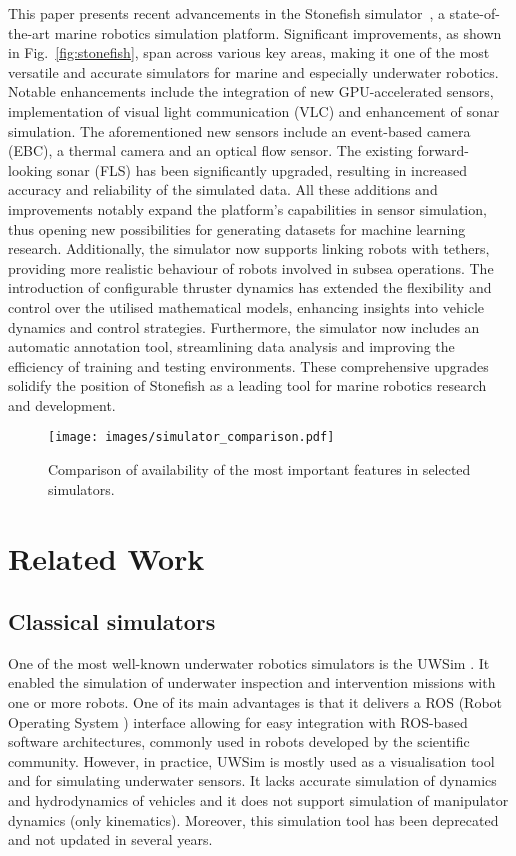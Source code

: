 This paper presents recent advancements in the Stonefish simulator~\cite{cieslak2019stonefish}, a state-of-the-art marine robotics simulation platform. Significant improvements, as shown in Fig.~\ref{fig:stonefish}, span across various key areas, making it one of the most versatile and accurate simulators for marine and especially underwater robotics. Notable enhancements include the integration of new GPU-accelerated sensors, implementation of visual light communication (VLC) and enhancement of sonar simulation. The aforementioned new sensors include an event-based camera (EBC), a thermal camera and an optical flow sensor. The existing forward-looking sonar (FLS) has been significantly upgraded, resulting in increased accuracy and reliability of the simulated data. 
All these additions and improvements notably expand the platform’s capabilities in sensor simulation, thus opening new possibilities for generating datasets for machine learning research. Additionally, the simulator now supports linking robots with tethers, providing more realistic behaviour of robots involved in subsea operations. The introduction of configurable thruster dynamics has extended the flexibility and control over the utilised mathematical models, enhancing insights into vehicle dynamics and control strategies. Furthermore, the simulator now includes an automatic annotation tool, streamlining data analysis and improving the efficiency of training and testing environments. These comprehensive upgrades solidify the position of Stonefish as a leading tool for marine robotics research and development.




\begin{figure*}[tp] 
\centering
    \texttt{[image: images/simulator\_comparison.pdf]}
    \caption{Comparison of availability of the most important features in selected simulators.}
    \label{fig:comparison}
\end{figure*}

\section{Related Work}




\subsection{Classical simulators}

One of the most well-known underwater robotics simulators is the UWSim \cite{dhurandher2008uwsim}.  It enabled the simulation of underwater inspection and intervention missions with one or more robots. One of its main advantages is that it delivers a ROS (Robot Operating System \cite{quigley2009ros}) interface allowing for easy integration with ROS-based software architectures, commonly used in robots developed by the scientific community. 
However, in practice, UWSim is mostly used as a visualisation tool and for simulating underwater sensors. It lacks accurate simulation of dynamics and hydrodynamics of vehicles and it does not support simulation of manipulator dynamics (only kinematics). Moreover, this simulation tool has been deprecated and not updated in several years.

